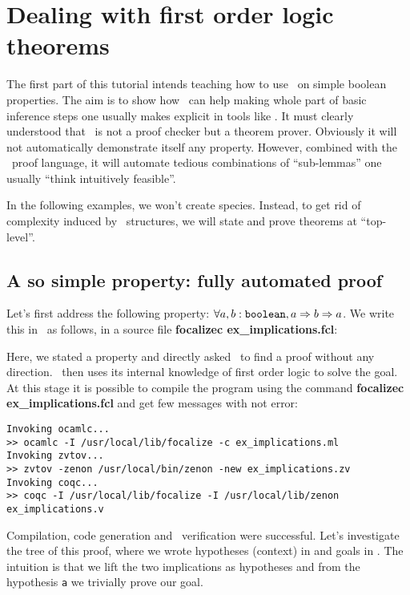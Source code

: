 \section{Dealing with first order logic theorems}

The first part of this tutorial intends teaching how to use \zenon\ on
simple boolean properties. The aim is to show how \zenon\ can help
making whole part of basic inference steps one usually makes explicit
in tools like \coq. It must clearly understood that \zenon\ is not a proof
checker but a theorem prover. Obviously it will not au\-to\-ma\-ti\-cal\-ly
demonstrate itself any property. However, combined with the \focal\
proof language, it will automate tedious combinations of ``sub-lemmas''
one usually ``think intuitively feasible''.

In the following examples, we won't create species. Instead, to get
rid of com\-ple\-xi\-ty induced by \focal\ structures, we will state and
prove theorems at ``top-level''.


\subsection{A so simple property: fully automated proof}
Let's first address the following property:
$\forall a, b : {\tt boolean}, a \Rightarrow b \Rightarrow a$.
We write this in \focal\ as follows, in a source file
\textbf{focalizec ex\_implications.fcl}:

{\scriptsize
}

Here, we stated a property and directly asked \zenon\ to find a proof
without any direction. \zenon\ then uses its internal knowledge of
first order logic to solve the goal. At this stage it is possible to
compile the program using the command \textbf{focalizec ex\_implications.fcl}
and get few messages with not error:

{\scriptsize
\begin{verbatim}
Invoking ocamlc...
>> ocamlc -I /usr/local/lib/focalize -c ex_implications.ml
Invoking zvtov...
>> zvtov -zenon /usr/local/bin/zenon -new ex_implications.zv
Invoking coqc...
>> coqc -I /usr/local/lib/focalize -I /usr/local/lib/zenon ex_implications.v
\end{verbatim}}

Compilation, code generation and \coq\ verification were
successful. Let's investigate the tree of this proof, where we wrote
hypotheses (context) in \green{green} and goals in \blue{blue}. The
intuition is that we lift the two implications as hypotheses and from
the hypothesis \lstinline"a" we trivially prove our goal.

